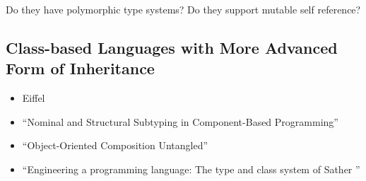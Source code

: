Do they have polymorphic type systems? Do they support mutable self reference?

\subsection{Class-based Languages with More Advanced Form of Inheritance}

\begin{itemize}
\item Eiffel

\item ``Nominal and Structural Subtyping in Component-Based Programming''
\item ``Object-Oriented Composition Untangled''
\item ``Engineering a programming language: The type and class system of Sather ''
\end{itemize}

